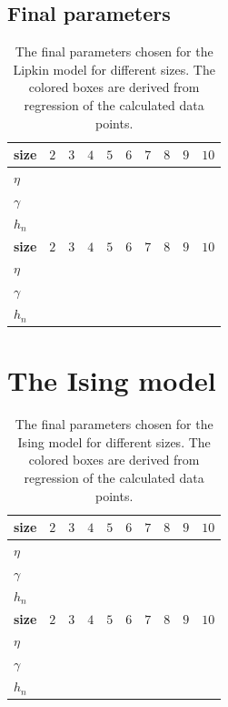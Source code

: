 \subsection{Final parameters}
\begin{table}[H]
  \caption{The final parameters chosen for the Lipkin model for different sizes. The colored boxes are derived from regression of the calculated data points.}\label{tab:lipkin_parameters}
  \begin{center}
    \begin{tabular}{|l|l|l|l|l|l|l|l|l|l|}
      \hline
      \textbf{size} & $2$ &$3$ & $4$& $5$& $6$& $7$&$8$ &$9$ & $10$ \\
      \hline
      $\eta$ & & & & & & & & & \\
      \hline
      $\gamma$ & & & & & & & & &  \\ 
      \hline
      $h_n$ & & & & & & & & & \\
      \hline
      \hline
      \textbf{size} & $2$ &$3$ & $4$& $5$& $6$& $7$&$8$ &$9$ & $10$ \\
      \hline
      $\eta$ & & & & & & & & &   \\
      \hline
      $\gamma$ & & & & & & & & &   \\ 
      \hline
      $h_n$ & & & & & & & & &  \\
      \hline

    \end{tabular}
  \end{center}
\end{table}


\section{The Ising model}
\begin{table}[H]
  \caption{The final parameters chosen for the Ising model for different sizes. The colored boxes are derived from regression of the calculated data points.}\label{tab:Ising_parameters}
  \begin{center}
    \begin{tabular}{|l|l|l|l|l|l|l|l|l|l|}
      \hline
      \textbf{size} & $2$ &$3$ & $4$& $5$& $6$& $7$&$8$ &$9$ & $10$ \\
      \hline
      $\eta$ & & & & & & & & & \\
      \hline
      $\gamma$ & & & & & & & & &  \\ 
      \hline
      $h_n$ & & & & & & & & & \\
      \hline
      \hline
      \textbf{size} & $2$ &$3$ & $4$& $5$& $6$& $7$&$8$ &$9$ & $10$ \\
      \hline
      $\eta$ & & & & & & & & &   \\
      \hline
      $\gamma$ & & & & & & & & &   \\ 
      \hline
      $h_n$ & & & & & & & & &  \\
      \hline

    \end{tabular}
  \end{center}
\end{table}


